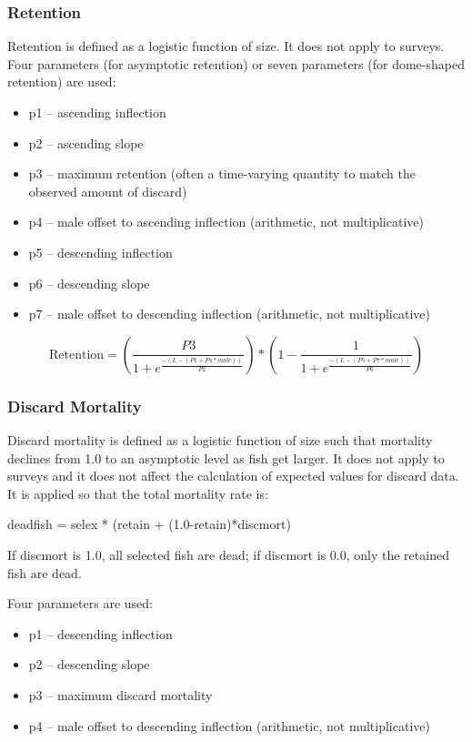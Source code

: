 \subsubsection{Retention}
Retention is defined as a logistic function of size.  It does not apply to surveys.  Four parameters (for asymptotic retention) or seven parameters (for dome-shaped retention) are used:
\begin{itemize}
	\item p1 – ascending inflection
	\item p2 – ascending slope
	\item p3 – maximum retention (often a time-varying quantity to match the observed amount of discard)
	\item p4 – male offset to ascending inflection (arithmetic, not multiplicative)
	\item p5 – descending inflection
	\item p6 – descending slope
	\item p7 – male offset to descending inflection (arithmetic, not multiplicative)
\end{itemize}
\begin{equation}
	\text{Retention} = \left(\frac{P3}{1 + e^{\frac{-(L-(P1+P4*male))}{P2}}}\right)*\left(1 - \frac{1}{1 + e^{\frac{-(L-(P5+P7*male))}{P6}}}\right)
\end{equation}

\subsubsection{Discard Mortality}
Discard mortality is defined as a logistic function of size such that mortality declines from 1.0 to an asymptotic level as fish get larger.  It does not apply to surveys and it does not affect the calculation of expected values for discard data.   It is applied so that the total mortality rate is:\\
\begin{center}
	deadfish = selex * (retain + (1.0-retain)*discmort)
\end{center}
If discmort is 1.0, all selected fish are dead; if discmort is 0.0, only the retained fish are dead.

Four parameters are used:
\begin{itemize}
	\item p1 – descending inflection
	\item p2 – descending slope
	\item p3 – maximum discard mortality
	\item p4 – male offset to descending inflection (arithmetic, not multiplicative)
\end{itemize}

